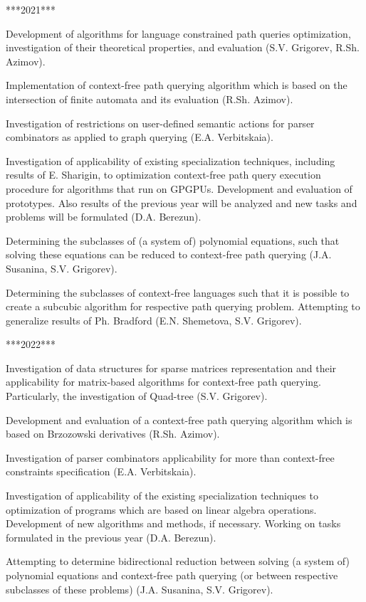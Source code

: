 \documentclass[12pt]{article}  %
\theoremstyle{remark}
\begin{document}
***2021***

Development of algorithms for language constrained path queries optimization, investigation of their theoretical properties, and evaluation (S.V. Grigorev, R.Sh. Azimov).

Implementation of context-free path querying algorithm which is based on the intersection of finite automata and its evaluation (R.Sh. Azimov).

Investigation of restrictions on user-defined semantic actions for parser combinators as applied to graph querying (E.A. Verbitskaia).

Investigation of applicability of existing specialization techniques, including results of E. Sharigin, to optimization context-free path query execution procedure for algorithms that run on GPGPUs.
Development and evaluation of prototypes.
Also results of the previous year will be analyzed and new tasks and problems will be formulated (D.A. Berezun).

Determining the subclasses of (a system of) polynomial equations, such that solving these equations can be reduced to context-free path querying (J.A. Susanina, S.V. Grigorev).

Determining the subclasses of context-free languages such that it is possible to create a subcubic algorithm for respective path querying problem.
Attempting to generalize results of Ph. Bradford (E.N. Shemetova, S.V. Grigorev).

***2022***

Investigation of data structures for sparse matrices representation and their applicability for matrix-based algorithms for context-free path querying.
Particularly, the investigation of Quad-tree (S.V. Grigorev).

Development and evaluation of a context-free path querying algorithm which is based on Brzozowski derivatives (R.Sh. Azimov).

Investigation of parser combinators applicability for more than context-free constraints specification (E.A. Verbitskaia).

Investigation of applicability of the existing specialization techniques to optimization of programs which are based on linear algebra operations.
Development of new algorithms and methods, if necessary.
Working on tasks formulated in the previous year (D.A. Berezun).

Attempting to determine bidirectional reduction between solving (a system of) polynomial equations and context-free path querying (or between respective subclasses of these problems) (J.A. Susanina, S.V. Grigorev).
\end{document}
